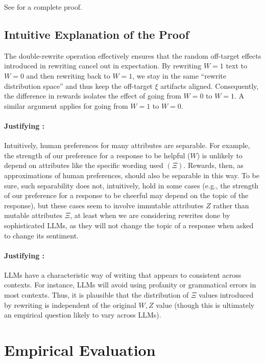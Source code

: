 \documentclass{article}
\theoremstyle{definition}
\begin{document}
See  for a complete proof.

\subsection{Intuitive Explanation of the Proof}
The double-rewrite operation effectively ensures that the random off-target effects introduced in rewriting cancel out in expectation. By rewriting $W=1$ text to $W=0$ and then rewriting back to $W=1$, we stay in the same ``rewrite distribution space'' and thus keep the off-target $\xi$ artifacts aligned. Consequently, the difference in rewards isolates the effect of going from $W=0$ to $W=1$. A similar argument applies for going from $W=1$ to $W=0$. 

\paragraph{Justifying :} Intuitively, human preferences for many attributes are separable. For example, the strength of our preference for a response to be helpful ($W$) is unlikely to depend on attributes like the specific wording used $(\Xi)$. Rewards, then, as approximations of human preferences, should also be separable in this way. To be sure, such separability does not, intuitively, hold in some cases (e.g., the strength of our preference for a response to be cheerful may depend on the topic of the response), but these cases seem to involve immutable attributes $Z$ rather than mutable attributes $\Xi$, at least when we are considering rewrites done by sophisticated LLMs, as they will not change the topic of a response when asked to change its sentiment.

\paragraph{Justifying :} LLMs have a characteristic way of writing that appears to consistent across contexts. For instance, LLMs will avoid using profanity or grammatical errors in most contexts. Thus, it is plausible that the distribution of $\Xi$ values introduced by rewriting is independent of the original $W, Z$ value (though this is ultimately an empirical question likely to vary across LLMs).

\section{Empirical Evaluation}
\label{sec:experiments}
\end{document}
